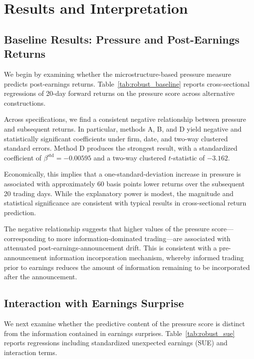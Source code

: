\section{Results and Interpretation}

\subsection{Baseline Results: Pressure and Post-Earnings Returns}

We begin by examining whether the microstructure-based pressure measure predicts post-earnings returns. Table~\ref{tab:robust_baseline} reports cross-sectional regressions of 20-day forward returns on the pressure score across alternative constructions.

Across specifications, we find a consistent negative relationship between pressure and subsequent returns. In particular, methods A, B, and D yield negative and statistically significant coefficients under firm, date, and two-way clustered standard errors. Method D produces the strongest result, with a standardized coefficient of $\beta^{\text{std}} = -0.00595$ and a two-way clustered $t$-statistic of $-3.162$.

Economically, this implies that a one-standard-deviation increase in pressure is associated with approximately 60 basis points lower returns over the subsequent 20 trading days. While the explanatory power is modest, the magnitude and statistical significance are consistent with typical results in cross-sectional return prediction.

The negative relationship suggests that higher values of the pressure score—corresponding to more information-dominated trading—are associated with attenuated post-earnings-announcement drift. This is consistent with a pre-announcement information incorporation mechanism, whereby informed trading prior to earnings reduces the amount of information remaining to be incorporated after the announcement.

\subsection{Interaction with Earnings Surprise}

We next examine whether the predictive content of the pressure score is distinct from the information contained in earnings surprises. Table~\ref{tab:robust_sue} reports regressions including standardized unexpected earnings (SUE) and interaction terms.

